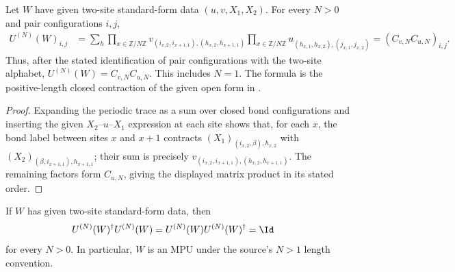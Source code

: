 \begin{lemma}
    \label{thm:mpu_supplied_two_site_periodic_circuit}
    \leanok
    Let $W$ have given two-site standard-form data $(u,v,X_1,X_2)$.
    For every $N>0$ and pair configurations $i,j$,
    \begin{align}
        U^{(N)}(W)_{i,j}
         & =\sum_h\prod_{x\in\mathbb Z/N\mathbb Z}
        v_{(i_{x,2},i_{x+1,1}),(h_{x,2},h_{x+1,1})}
        \prod_{x\in\mathbb Z/N\mathbb Z}
        u_{(h_{x,1},h_{x,2}),(j_{x,1},j_{x,2})}
        =(C_{v,N}C_{u,N})_{i,j}.
    \end{align}
    Thus, after the stated identification of pair configurations with the
    two-site alphabet, $U^{(N)}(W)=C_{v,N}C_{u,N}$. This includes $N=1$.
    The formula is the positive-length closed contraction of the given
    open form in \cite[Equations~\texttt{uuvv} and
        \texttt{StandardForm}]{Cirac2017MPU}.
\end{lemma}

\begin{proof}\leanok
    Expanding the periodic trace as a sum over closed bond configurations and
    inserting the given $X_2$--$u$--$X_1$ expression at each site shows that, for
    each $x$, the bond label between sites $x$ and $x+1$ contracts
    $(X_1)_{(i_{x,2},\beta),h_{x,2}}$ with
    $(X_2)_{(\beta,i_{x+1,1}),h_{x+1,1}}$; their sum is precisely
    $v_{(i_{x,2},i_{x+1,1}),(h_{x,2},h_{x+1,1})}$. The remaining factors
    form $C_{u,N}$, giving the displayed matrix product in its stated order.
\end{proof}

\begin{lemma}
    \label{thm:mpu_supplied_two_site_periodic_unitary}
    \leanok
    If $W$ has given two-site standard-form data, then
    \begin{align}
        U^{(N)}(W)^{\dagger}U^{(N)}(W)
         & =U^{(N)}(W)U^{(N)}(W)^{\dagger}=\Id
    \end{align}
    for every $N>0$. In particular, $W$ is an MPU under the source's
    $N>1$ length convention.
\end{lemma}

